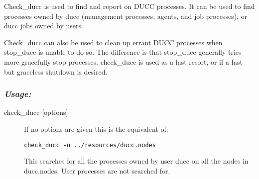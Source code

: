     Check\_ducc is used to find and report on DUCC processes. It can be used to find processes 
    owned by ducc (management processes, agents, and job processes), or ducc jobs owned by 
    users. 
    
    Check\_ducc can also be used to clean up errant DUCC processes when stop\_ducc is unable 
    to do so. The difference is that stop\_ducc generally tries more gracefully stop processes. 
    check\_ducc is used as a last resort, or if a fast but graceless shutdown is desired. 
    
    \subsubsection{\em{Usage: }}

        \begin{description} 
          \item[check\_ducc {[options]}]
              If no options are given this is the equivalent of: 
\begin{verbatim}
check_ducc -n ../resources/ducc.nodes 
\end{verbatim}
              
              This searches for all the processes owned by user ducc on all the nodes in ducc.nodes. User 
              processes are not searched for. 
        \end{description}
            
